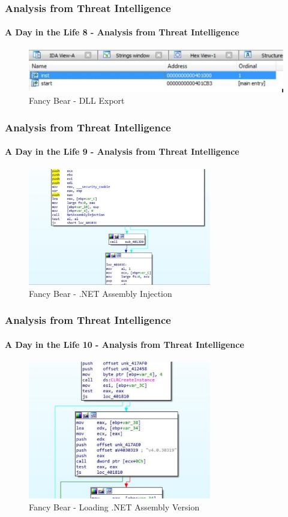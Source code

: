 \documentclass[aspectratio=169]{beamer}
\begin{document}
\begin{frame}
  \frametitle{Analysis from Threat Intelligence}
  \framesubtitle{A Day in the Life 8 - Analysis from Threat Intelligence}
  \begin{center}
    \begin{figure}
      \includegraphics[width=14cm,keepaspectratio]{fancy_bear_analysis_0}
      \caption{Fancy Bear - DLL Export}
    \end{figure}
  \end{center}
\end{frame}

\begin{frame}
  \frametitle{Analysis from Threat Intelligence}
  \framesubtitle{A Day in the Life 9 - Analysis from Threat Intelligence}
  \begin{center}
    \begin{figure}
      \includegraphics[width=8cm,keepaspectratio]{fancy_bear_analysis_1}
      \caption{Fancy Bear - .NET Assembly Injection}
    \end{figure}
  \end{center}
\end{frame}

\begin{frame}
  \frametitle{Analysis from Threat Intelligence}
  \framesubtitle{A Day in the Life 10 - Analysis from Threat Intelligence}
  \begin{center}
    \begin{figure}
      \includegraphics[width=8cm,keepaspectratio]{fancy_bear_analysis_2}
      \caption{Fancy Bear - Loading .NET Assembly Version}
    \end{figure}
  \end{center}
\end{frame}
\end{document}
